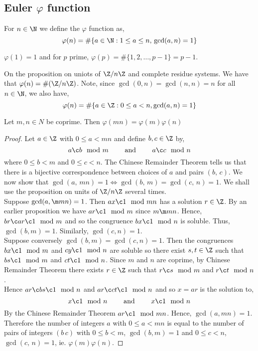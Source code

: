 \subsection{Euler $\varphi$ function}
\begin{ndefi}
  For $n \in \N$ we define the $\varphi$ function as,
  $$ \varphi(n) = \#\{a \in \N : 1 \le a \le n,\, \gcd(a, n) = 1\} $$
\end{ndefi}

\begin{remark}
   $\varphi(1) = 1$ and for $p$ prime, $\varphi(p) = \#\{1,2, \dots, p-1\} = p-1$.
\end{remark}

\begin{remark}
   On the proposition on uniots of $\Z/n\Z$ and complete residue systems. We have that $\varphi(n) = \#(\Z/n\Z)$. Note, since $\gcd(0, n) = \gcd(n, n) = n$ for all $n \in \N$, we also have,
   $$ \varphi(n) = \#\{a \in\Z:0\le a < n, \gcd(a, n) = 1\} $$
\end{remark}

\begin{nthm}
  Let $m ,n \in N$ be coprime. Then $\varphi(mn) = \varphi(m)\varphi(n)$
\end{nthm}
\begin{proof}
  Let $a \in \Z$ with $0 \le a < mn$ and define $b, c \in \Z$ by,
  $$ a \c b \mod m \qquad\text{ and }\qquad a \c c \mod n $$
  where $0 \le b < m$ and $0 \le c < n$. The Chinese Remainder Theorem tells us that there is a bijective correspondence between choices of $a$ and pairs $(b,\, c)$. We now show that $\gcd(a,\,mn) = 1 \iff \gcd(b,\,m)=\gcd(c,\,n) = 1$. We shall use the proposition on units of $\Z/n\Z$ several times.\\

  \noindent
  Suppose $\gcd(a,\m mn) = 1$. Then $ax \c 1 \mod mn$ has a solution $r \in\Z$. By an earlier proposition we have $ar \c 1 \mod m$ since $m \m mn$. Hence, $br \c ar \c 1\mod m$ and so the congruence $bx \c 1\mod n$ is soluble. Thus, $\gcd(b, m)=1$. Similarly, $\gcd(c, n) = 1$.\\

  \noindent
  Suppose conversely $\gcd(b, m) = \gcd(c, n) = 1$. Then the congruences $bx \c 1\mod m$ and $cy \c 1\mod n$ are soluble so there exist $s, t \in \Z$ such that $bs \c 1\mod m$ and $ct \c 1 \mod n$. Since $m$ and $n$ are coprime, by Chinese Remainder Theorem there exists $r \in \Z$ such that $r \c s \mod m$ and $r \c t \mod n$.\\

  \noindent
  Hence $ar \c bs \c 1\mod n$ and $ar \c ct \c 1\mod n$ and so $x = ar$ is the solution to,
  $$ x \c 1 \mod n \qquad\text{ and }\qquad x \c 1 \mod n $$
  By the Chinese Remainder Theorem $ar \c 1 \mod mn$. Hence, $\gcd(a, mn) = 1$.\\

  Therefore the number of integers $a$ with $0 \le a < mn$ is equal to the number of pairs of integers $(b\, c)$ with $0 \le b < m$, $\gcd(b, m) = 1$ and $0 \le c < n$, $\gcd(c,\, n)= 1$, ie. $\varphi(m)\varphi(n)$.
\end{proof}

